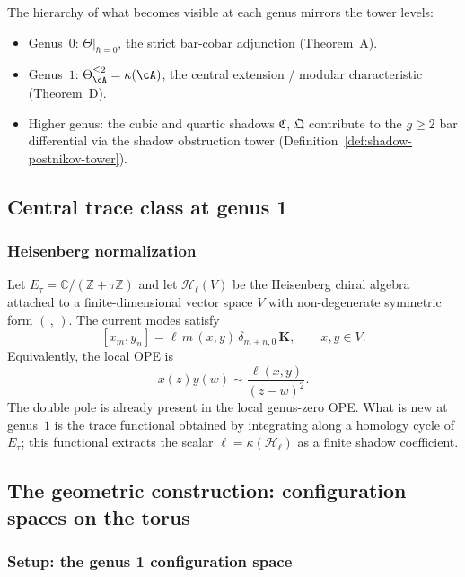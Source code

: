 \begin{remark}
\label{rem:central-extension-tower-level}
The hierarchy of what becomes visible at each genus mirrors the
tower levels:
\begin{itemize}
\item Genus~$0$: $\Theta|_{\hbar=0}$, the strict bar-cobar
 adjunction (Theorem~A).
\item Genus~$1$: $\Theta_\cA^{\leq 2} = \kappa(\cA)$, the
 central extension / modular characteristic (Theorem~D).
\item Higher genus: the cubic and quartic shadows
 $\mathfrak{C}$, $\mathfrak{Q}$ contribute to the
 $g \geq 2$ bar differential via the shadow obstruction tower
 (Definition~\ref{def:shadow-postnikov-tower}).
\end{itemize}
\end{remark}

\subsection{Central trace class at genus 1}

\subsubsection{Heisenberg normalization}

Let $E_\tau=\mathbb C/(\mathbb Z+\tau\mathbb Z)$ and let
$\mathcal H_\ell(V)$ be the Heisenberg chiral algebra attached to a
finite-dimensional vector space $V$ with non-degenerate symmetric form
$(\, ,\,)$. The current modes satisfy
\[
[x_m,y_n]=\ell\,m\,(x,y)\,\delta_{m+n,0}\,\mathbf K,
\qquad x,y\in V.
\]
Equivalently, the local OPE is
\[
x(z)y(w)\sim \frac{\ell(x,y)}{(z-w)^2}.
\]
The double pole is already present in the local genus-zero OPE. What is
new at genus~$1$ is the trace functional obtained by integrating along a
homology cycle of $E_\tau$; this functional extracts the scalar
$\ell=\kappa(\mathcal H_\ell)$ as a finite shadow coefficient.

\subsection{The geometric construction: configuration spaces on the torus}

\subsubsection{Setup: the genus 1 configuration space}

